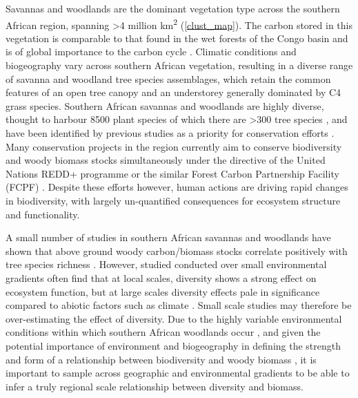 \documentclass[11pt,a4paper]{article}
\newcommand{\textapprox}{\raisebox{0.5ex}{\texttildelow}}  %
\begin{document}
Savannas and woodlands are the dominant vegetation type across the southern African region, spanning >4 million km\textsuperscript{2} \citep{Ryan2016} (\autoref{clust_map}). The carbon stored in this vegetation is comparable to that found in the wet forests of the Congo basin and is of global importance to the carbon cycle \citep{Houghton2009, Mayaux2008}. Climatic conditions and biogeography vary across southern African vegetation, resulting in a diverse range of savanna and woodland tree species assemblages, which retain the common features of an open tree canopy and an understorey generally dominated by C4 grass species. Southern African savannas and woodlands are highly diverse, thought to harbour \textapprox{}8500 plant species of which there are >300 tree species \citep{Frost1996}, and have been identified by previous studies as a priority for conservation efforts \citep{Byers2001, Mittermeier2003}. Many conservation projects in the region currently aim to conserve biodiversity and woody biomass stocks simultaneously under the directive of the United Nations REDD+ programme or the similar Forest Carbon Partnership Facility (FCPF) \citep{Hinsley2015}. Despite these efforts however, human actions are driving rapid changes in biodiversity, with largely un-quantified consequences for ecosystem structure and functionality.


A small number of studies in southern African savannas and woodlands have shown that above ground woody carbon/biomass stocks correlate positively with tree species richness \citep{McNicol2018, Shirima2015, Mutowo2012}. However, studied conducted over small environmental gradients often find that at local scales, diversity shows a strong effect on ecosystem function, but at large scales diversity effects pale in significance compared to abiotic factors such as climate \citep{Pasari2013}. Small scale studies may therefore be over-estimating the effect of diversity. Due to the highly variable environmental conditions within which southern African woodlands occur \citep{Frost1996}, and given the potential importance of environment and biogeography in defining the strength and form of a relationship between biodiversity and woody biomass \citep{}, it is important to sample across geographic and environmental gradients to be able to infer a truly regional scale relationship between diversity and biomass. 

\end{document}
